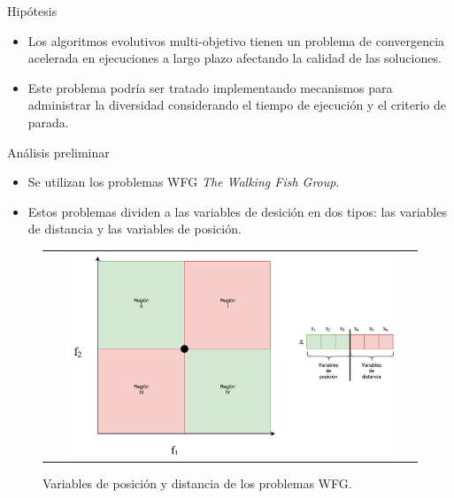 \documentclass{beamer}
\begin{document}
\begin{frame}{Hipótesis}
    \begin{itemize}
        \item Los algoritmos evolutivos multi-objetivo tienen un problema de convergencia acelerada en ejecuciones a largo plazo afectando la calidad de las soluciones.
	\item Este problema podría ser tratado implementando mecanismos para administrar la diversidad considerando el tiempo de ejecución y el criterio de parada.
    \end{itemize}
\end{frame}


\begin{frame}{Análisis preliminar}
\begin{itemize}
\scriptsize
\justifying
\item Se utilizan los problemas WFG \textit{The Walking Fish Group}.
\justifying
\item Estos problemas dividen a las variables de desición en dos tipos: las variables de distancia y las variables de posición.
\end{itemize}
\begin{figure}
\centering
\begin{tabular}{c}
 \includegraphics[width=0.9\textwidth]{Images/Parametros_Posicion_Distancia.pdf}   \\
\end{tabular}
\caption{Variables de posición y distancia de los problemas WFG.}
\end{figure}
\end{frame}
\end{document}
